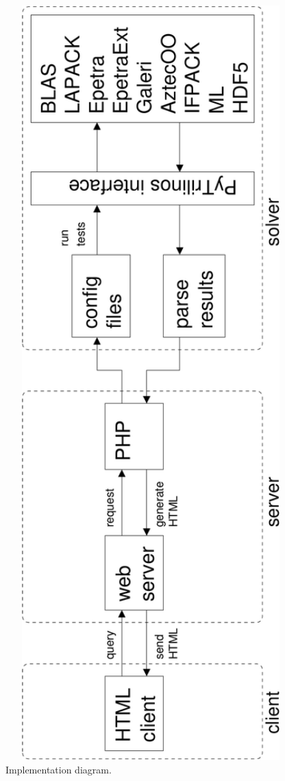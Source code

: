 \documentclass[11pt,relax]{SANDreport}
\begin{document}
\begin{figure}
\begin{center}
\includegraphics[width=14cm]{diagram}
\caption{Implementation diagram.}
\label{fig:design}
\end{center}
\end{figure}
\end{document}
